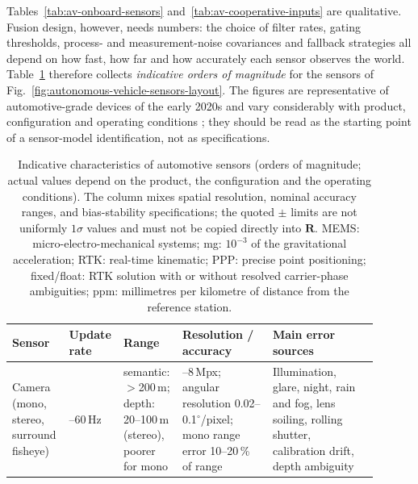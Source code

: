 Tables~\ref{tab:av-onboard-sensors} and~\ref{tab:av-cooperative-inputs} are qualitative. Fusion design, however, needs numbers: the choice of filter rates, gating thresholds, process- and measurement-noise covariances and fallback strategies all depend on how fast, how far and how accurately each sensor observes the world. Table~\ref{tab:av-sensor-characteristics} therefore collects \emph{indicative orders of magnitude} for the sensors of Fig.~\ref{fig:autonomous-vehicle-sensors-layout}. The figures are representative of automotive-grade devices of the early 2020s and vary considerably with product, configuration and operating conditions \cite{yeong2021_sensors,patole2017_radar,groves2013_gnss}; they should be read as the starting point of a sensor-model identification, not as specifications.

\begin{table}[!t]
    \centering
    \renewcommand{\arraystretch}{1.25}%
    \scriptsize
    \caption{Indicative characteristics of automotive sensors (orders of magnitude; actual values depend on the product, the configuration and the operating conditions). The column mixes spatial resolution, nominal accuracy ranges, and bias-stability specifications; the quoted $\pm$ limits are not uniformly $1\sigma$ values and must not be copied directly into $\mathbf{R}$. MEMS: micro-electro-mechanical systems; mg: $10^{-3}$ of the gravitational acceleration; RTK: real-time kinematic; PPP: precise point positioning; fixed/float: RTK solution with or without resolved carrier-phase ambiguities; ppm: millimetres per kilometre of distance from the reference station.}
    \label{tab:av-sensor-characteristics}
    \begin{tabular}{>{\raggedright\arraybackslash}p{0.15\linewidth} >{\raggedright\arraybackslash}p{0.10\linewidth} >{\raggedright\arraybackslash}p{0.13\linewidth} >{\raggedright\arraybackslash}p{0.24\linewidth} >{\raggedright\arraybackslash}p{0.28\linewidth}}
        \hline
        \textbf{Sensor} & \textbf{Update rate} & \textbf{Range} & \textbf{Resolution / accuracy} & \textbf{Main error sources} \\
        \hline
        Camera (mono, stereo, surround fisheye) & 10--60\,Hz & semantic: $>$200\,m; depth: 20--100\,m (stereo), poorer for mono & 1--8\,Mpx; angular resolution 0.02--0.1$^{\circ}$/pixel; mono range error 10--20\,\% of range & Illumination, glare, night, rain and fog, lens soiling, rolling shutter, calibration drift, depth ambiguity \\
        \hline

\end{tabular}
\end{table}
